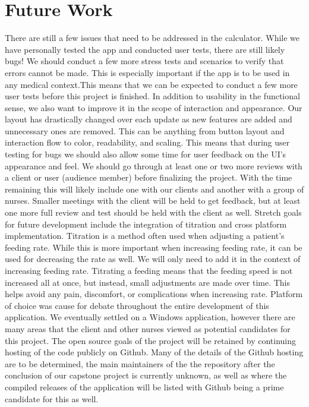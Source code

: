 \documentclass[onecolumn, draftclsnofoot,10pt, compsoc]{IEEEtran}
\begin{document}
\section{Future Work}
There are still a few issues that need to be addressed in the calculator. While we have personally tested the app and conducted user tests, there are still likely bugs! We should conduct a few more stress tests and scenarios to verify that errors cannot be made. This is especially important if the app is to be used in any medical context.This means that we can be expected to conduct a few more user tests before this project is finished.
\newline 
In addition to usability in the functional sense, we also want to improve it in the scope of interaction and appearance. Our layout has drastically changed over each update as new features are added and unnecessary ones are removed. This can be anything from button layout and interaction flow to color, readability, and scaling. This means that during user testing for bugs we should also allow some time for user feedback on the UI's appearance and feel. We should go through at least one or two more reviews with a client or user (audience member) before finalizing the project. With the time remaining this will likely include one with our clients and another with a group of nurses. Smaller meetings with the client will be held to get feedback, but at least one more full review and test should be held with the client as well. 
\newline
Stretch goals for future development include the integration of titration and cross platform implementation. Titration is a method often used when adjusting a patient's feeding rate. While this is more important when increasing feeding rate, it can be used for decreasing the rate as well. We will only need to add it in the context of increasing feeding rate. Titrating a feeding means that the feeding speed is not increased all at once, but instead, small adjustments are made over time. This helps avoid any pain, discomfort, or complications when increasing rate. 
\newline
Platform of choice was cause for debate throughout the entire development of this application. We eventually settled on a Windows application, however there are many areas that the client and other nurses viewed as potential candidates for this project.
\newline
The open source goals of the project will be retained by continuing hosting of the code publicly on Github.
Many of the details of the Github hosting are to be determined, the main maintainers of the the repository after the conclusion of our capstone project is currently unknown, as well as where the compiled releases of the application will be listed with Github being a prime candidate for this as well.
\end{document}
